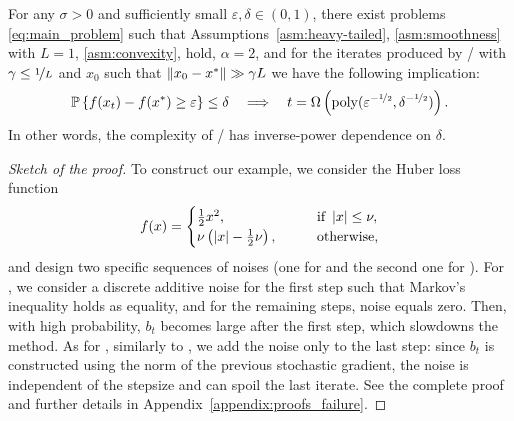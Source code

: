 \documentclass{article}
\begin{document}
\begin{theorem}\label{thm:AdaGrads_failure_main}
    For any $\sigma > 0$ and sufficiently small $\varepsilon, \delta \in (0,1)$, there exist problems \eqref{eq:main_problem} such that Assumptions~\ref{asm:heavy-tailed}, \ref{asm:smoothness} with $L = 1$, \ref{asm:convexity}, hold, $\alpha = 2$, and for the iterates produced by / with $\gamma \leq \nicefrac{1}{L}$ and $x_0$ such that $\left\lVert x_0 - x^*\right\rVert \gg \gamma L$ we have the following implication:
    \begin{equation}
        {\mathbb P}\left\{f(x_t) - f(x^*) \geq \varepsilon\right\} \leq \delta \quad \Longrightarrow \quad t = \Omega\left(\mathrm{poly}(\varepsilon^{-\nicefrac{1}{2}}, \delta^{-\nicefrac{1}{2}})\right). \label{eq:inverse_power_dependence}
    \end{equation}
    In other words, the complexity of / has inverse-power dependence on $\delta$.
\end{theorem}
\begin{proof}[Sketch of the proof]
    To construct our example, we consider the Huber loss function \citep{huber1992robust}
\begin{align}
    \label{eq:huber}
    f(x) = \begin{cases}
        \frac{1}{2}x^2, \qquad & \text{if } \left\lvert x\right\rvert \leq \nu,\\
        \nu\left(\left\lvert x\right\rvert - \frac{1}{2}\nu\right), \qquad &\text{otherwise,}
    \end{cases}
\end{align}
and design two specific sequences of noises (one for  and the second one for ). For , we consider a discrete additive noise for the first step such that Markov's inequality holds as equality, and for the remaining steps, noise equals zero. Then, with high probability, $b_t$ becomes large after the first step, which slowdowns the method. As for , similarly to \citet{sadiev2023high}, we add the noise only to the last step: since $b_t$ is constructed using the norm of the previous stochastic gradient, the noise is independent of the stepsize and can spoil the last iterate. See the complete proof and further details in  Appendix~\ref{appendix:proofs_failure}.
\end{proof}
\end{document}
